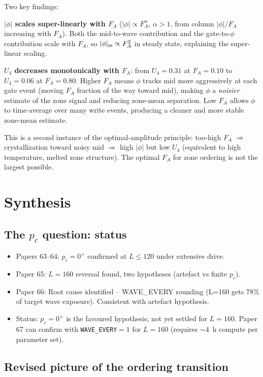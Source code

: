 \documentclass[12pt,a4paper]{article}
\begin{document}
Two key findings:

\textbf{$|\phi|$ scales super-linearly with $F_A$} ($|\phi| \propto F_A^\alpha$,
$\alpha > 1$, from column $|\phi|/F_A$ increasing with $F_A$).
Both the mid-to-wave contribution and the gate-to-$\phi$ contribution scale
with $F_A$, so $|\phi|_{\rm ss} \propto F_A^2$ in steady state,
explaining the super-linear scaling.

\textbf{$U_4$ decreases monotonically with $F_A$}:
from $U_4 = 0.31$ at $F_A=0.10$ to $U_4 = 0.06$ at $F_A=0.80$.
Higher $F_A$ means $\phi$ tracks mid more aggressively at each gate event
(moving $F_A$ fraction of the way toward mid), making $\phi$ a
\emph{noisier} estimate of the zone signal and reducing zone-mean separation.
Low $F_A$ allows $\phi$ to time-average over many write events,
producing a cleaner and more stable zone-mean estimate.

This is a second instance of the optimal-amplitude principle:
too-high $F_A$ $\Rightarrow$ crystallization toward noisy mid $\Rightarrow$
high $|\phi|$ but low $U_4$ (equivalent to high temperature, melted zone structure).
The optimal $F_A$ for zone ordering is not the largest possible.

\section{Synthesis}

\subsection{The $p_c$ question: status}

\begin{itemize}
\item Papers 63--64: $p_c = 0^+$ confirmed at $L \le 120$ under extensive drive.
\item Paper 65: $L=160$ reversal found, two hypotheses (artefact vs finite $p_c$).
\item Paper 66: Root cause identified -- WAVE\_EVERY rounding (L=160 gets 78\%
  of target wave exposure). Consistent with artefact hypothesis.
\item Status: $p_c = 0^+$ is the favoured hypothesis; not yet settled for $L=160$.
  Paper 67 can confirm with \texttt{WAVE\_EVERY}$=1$ for $L=160$ (requires
  $\sim 4$~h compute per parameter set).
\end{itemize}

\subsection{Revised picture of the ordering transition}
\end{document}
